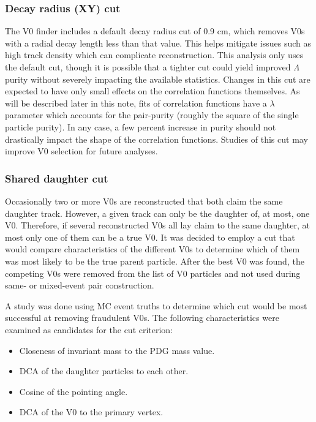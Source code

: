 \subsubsection{Decay radius (XY) cut}
The V0 finder includes a default decay radius cut of 0.9 cm, which removes V0s with a radial decay length less than that value.  
This helps mitigate issues such as high track density which can complicate reconstruction.  
This analysis only uses the default cut, though it is possible that a tighter cut could yield improved $\Lambda$ purity without severely impacting the available statistics.  
Changes in this cut are expected to have only small effects on the correlation functions themselves.  
As will be described later in this note, fits of correlation functions have a $\lambda$ parameter which accounts for the pair-purity (roughly the square of the single particle purity).  
In any case, a few percent increase in purity should not drastically impact the shape of the correlation functions.
Studies of this cut may improve V0 selection for future analyses.

\subsubsection{Shared daughter cut}

Occasionally two or more V0s are reconstructed that both claim the same daughter track.  
However, a given track can only be the daughter of, at most, one V0.  
Therefore, if several reconstructed V0s all lay claim to the same daughter, at most only one of them can be a true V0.  
It was decided to employ a cut that would compare characteristics of the different V0s to determine which of them was most likely to be the true parent particle.  
After the best V0 was found, the competing V0s were removed from the list of V0 particles and not used during same- or mixed-event pair construction.

A study was done using MC event truths to determine which cut would be most successful at removing fraudulent V0s.  
The following characteristics were examined as candidates for the cut criterion:

\begin{itemize}
\item Closeness of invariant mass to the PDG mass value.
\item DCA of the daughter particles to each other.
\item Cosine of the pointing angle.
\item DCA of the V0 to the primary vertex.
\end{itemize}

